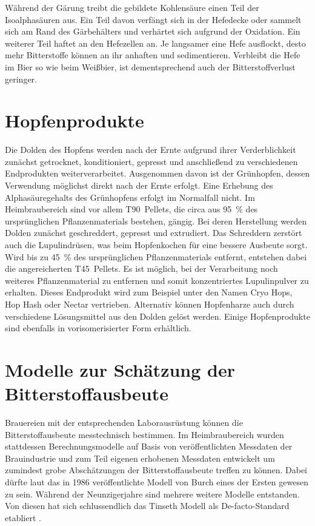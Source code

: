 \documentclass[a4paper,parskip=half]{scrartcl}
\begin{document}
Während der Gärung treibt die gebildete Kohlensäure einen Teil der Isoalphasäuren aus. Ein Teil davon verfängt sich in der Hefedecke oder sammelt sich am Rand des Gärbehälters und verhärtet sich aufgrund der Oxidation. Ein weiterer Teil haftet an den Hefezellen an. Je langsamer eine Hefe ausflockt, desto mehr Bitterstoffe können an ihr anhaften und sedimentieren. Verbleibt die Hefe im Bier so wie beim Weißbier, ist dementsprechend auch der Bitterstoffverlust geringer. \parencite[126]{Garetz1994} 

\section*{Hopfenprodukte}

Die Dolden des Hopfens werden nach der Ernte aufgrund ihrer Verderblichkeit zunächst getrocknet, konditioniert, gepresst und anschließend zu verschiedenen Endprodukten weiterverarbeitet. Ausgenommen davon ist der Grünhopfen, dessen Verwendung möglichst direkt nach der Ernte erfolgt. Eine Erhebung des Alphasäuregehalts des Grünhopfens erfolgt im Normalfall nicht. Im Heimbraubereich sind vor allem T90~Pellets, die circa aus 95~\% des ursprünglichen Pflanzenmaterials bestehen, gängig. Bei deren Herstellung werden Dolden zunächst geschreddert, gepresst und extrudiert. Das Schreddern zerstört auch die Lupulindrüsen, was beim Hopfenkochen für eine bessere Ausbeute sorgt. Wird bis zu 45~\% des ursprünglichen Pflanzenmaterials entfernt, entstehen dabei die angereicherten T45~Pellets. Es ist möglich, bei der Verarbeitung noch weiteres Pflanzenmaterial zu entfernen und somit konzentriertes Lupulinpulver zu erhalten. Dieses Endprodukt wird zum Beispiel unter den Namen Cryo Hops, Hop Hash oder Nectar vertrieben. Alternativ können Hopfenharze auch durch verschiedene Lösungsmittel aus den Dolden gelöst werden. Einige Hopfenprodukte sind ebenfalls in vorisomerisierter Form erhältlich. \parencites[166-172]{Nottebohm2020}[80-90]{Garetz1994}

\section*{Modelle zur Schätzung der Bitterstoffausbeute}

Brauereien mit der entsprechenden Laborausrüstung können die Bitterstoffausbeute messtechnisch bestimmen. Im Heimbraubereich wurden stattdessen Berechnungsmodelle auf Basis von veröffentlichten Messdaten der Brauindustrie und zum Teil eigenen erhobenen Messdaten entwickelt um zumindest grobe Abschätzungen der Bitterstoffausbeute treffen zu können. Dabei dürfte laut \textcite{Bonham2001} das in 1986 veröffentlichte Modell von Burch eines der Ersten gewesen zu sein. Während der Neunzigerjahre sind mehrere weitere Modelle entstanden. Von diesen hat sich schlussendlich das Tinseth Modell als De-facto-Standard etabliert \parencite[185]{Hieronymus2012}.
\end{document}
